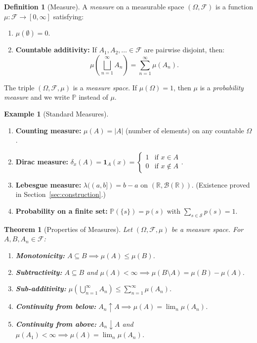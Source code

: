 \documentclass[11pt,a4paper]{article}
\theoremstyle{definition}
\newtheorem{definition}{Definition}[section]
\newtheorem{example}{Example}[section]
\theoremstyle{plain}
\newtheorem{theorem}{Theorem}[section]
\theoremstyle{remark}
\newcommand{\R}{\mathbb{R}}
\newcommand{\Prob}{\mathbb{P}}
\newcommand{\indicator}{\mathbf{1}}
\newcommand{\Borel}{\mathcal{B}}
\begin{document}
\begin{definition}[Measure]
\label{def:measure}
A \emph{measure} on a measurable space $(\Omega, \mathcal{F})$ is a function
$\mu: \mathcal{F} \to [0, \infty]$ satisfying:
\begin{enumerate}[nosep,label=(\roman*)]
    \item $\mu(\emptyset) = 0$.
    \item \textbf{Countable additivity:} If $A_1, A_2, \ldots \in \mathcal{F}$ are
    pairwise disjoint, then:
    \begin{equation}
        \mu\!\left(\bigsqcup_{n=1}^\infty A_n\right) = \sum_{n=1}^\infty \mu(A_n).
        \label{eq:countable_additivity}
    \end{equation}
\end{enumerate}
The triple $(\Omega, \mathcal{F}, \mu)$ is a \emph{measure space}. If
$\mu(\Omega) = 1$, then $\mu$ is a \emph{probability measure} and we write
$\Prob$ instead of $\mu$.
\end{definition}

\begin{example}[Standard Measures]
\label{ex:measures}
\begin{enumerate}[nosep,label=(\alph*)]
    \item \textbf{Counting measure:} $\mu(A) = |A|$ (number of elements) on any countable $\Omega$.
    \item \textbf{Dirac measure:} $\delta_x(A) = \indicator_A(x) = \begin{cases} 1 & \text{if } x \in A \\ 0 & \text{if } x \notin A \end{cases}$.
    \item \textbf{Lebesgue measure:} $\lambda((a,b]) = b - a$ on $(\R, \Borel(\R))$. (Existence proved in Section~\ref{sec:construction}.)
    \item \textbf{Probability on a finite set:} $\Prob(\{s\}) = p(s)$ with $\sum_{s \in \mathcal{S}} p(s) = 1$.
\end{enumerate}
\end{example}

\begin{theorem}[Properties of Measures]
\label{thm:measure_props}
Let $(\Omega, \mathcal{F}, \mu)$ be a measure space. For $A, B, A_n \in \mathcal{F}$:
\begin{enumerate}[nosep,label=(\alph*)]
    \item \textbf{Monotonicity:} $A \subseteq B \implies \mu(A) \leq \mu(B)$.
    \item \textbf{Subtractivity:} $A \subseteq B$ and $\mu(A) < \infty \implies \mu(B \setminus A) = \mu(B) - \mu(A)$.
    \item \textbf{Sub-additivity:} $\mu\!\left(\bigcup_{n=1}^\infty A_n\right) \leq \sum_{n=1}^\infty \mu(A_n)$.
    \item \textbf{Continuity from below:} $A_n \uparrow A \implies \mu(A) = \lim_n \mu(A_n)$.
    \item \textbf{Continuity from above:} $A_n \downarrow A$ and $\mu(A_1) < \infty \implies \mu(A) = \lim_n \mu(A_n)$.
\end{enumerate}
\end{theorem}
\end{document}
